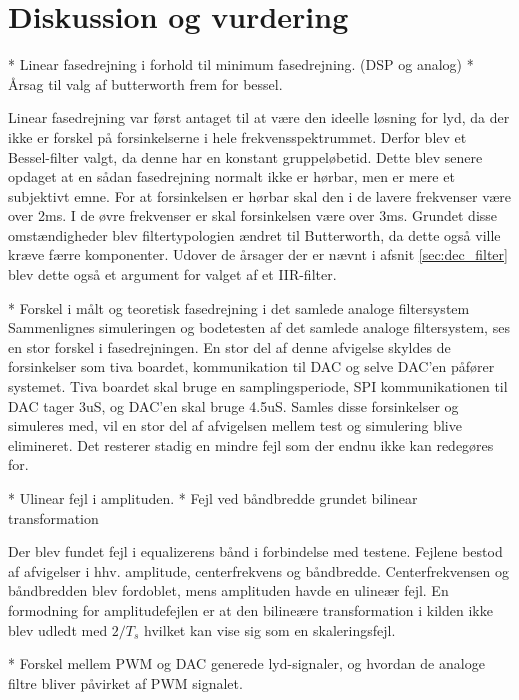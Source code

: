 \chapter{Diskussion og vurdering}\label{kap:diskussion}




* Linear fasedrejning i forhold til minimum fasedrejning. (DSP og analog)
* Årsag til valg af butterworth frem for bessel. 

Linear fasedrejning var først antaget til at være den ideelle løsning for lyd, da der ikke er forskel på forsinkelserne i hele frekvensspektrummet. Derfor blev et Bessel-filter valgt, da denne har en konstant gruppeløbetid. 
Dette blev senere opdaget at en sådan fasedrejning normalt ikke er hørbar, men er mere et subjektivt emne. 
For at forsinkelsen er hørbar skal den i de lavere frekvenser være over 2ms. 
I de øvre frekvenser er skal forsinkelsen være over 3ms.
Grundet disse omstændigheder blev filtertypologien ændret til Butterworth, da dette også ville kræve færre komponenter. 
Udover de årsager der er nævnt i afsnit \ref{sec:dec_filter} blev dette også et argument for valget af et IIR-filter. 


* Forskel i målt og teoretisk fasedrejning i det samlede analoge filtersystem
Sammenlignes simuleringen og bodetesten af det samlede analoge filtersystem, ses en stor forskel i fasedrejningen. En stor del af denne afvigelse skyldes de forsinkelser som tiva boardet, kommunikation til DAC og selve DAC'en påfører systemet. 
Tiva boardet skal bruge en samplingsperiode, SPI kommunikationen til DAC tager 3uS, og DAC'en skal bruge 4.5uS. Samles disse forsinkelser og simuleres med, vil en stor del af afvigelsen mellem test og simulering blive elimineret. Det resterer stadig en mindre fejl som der endnu ikke kan redegøres for. 

* Ulinear fejl i amplituden.
* Fejl ved båndbredde grundet bilinear transformation 

Der blev fundet fejl i equalizerens bånd i forbindelse med testene. Fejlene bestod af afvigelser i hhv. amplitude, centerfrekvens og båndbredde. Centerfrekvensen og båndbredden blev fordoblet, mens amplituden havde en ulineær fejl. 
En formodning for amplitudefejlen er at den bilineære transformation i kilden ikke blev udledt med $2/T_s$ hvilket kan vise sig som en skaleringsfejl.




* Forskel mellem PWM og DAC generede lyd-signaler, og hvordan de analoge filtre bliver påvirket af PWM signalet.



